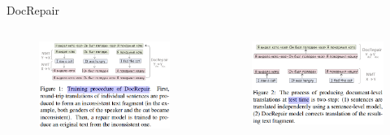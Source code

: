 \begin{frame}{DocRepair}
	\begin{columns}[c] %
		\begin{column}{.50\textwidth}
			\begin{figure}
				\centering
				\includegraphics[width=\linewidth]{Images/docrepair_train}
				\label{fig:docrepairtrain}
			\end{figure}
		\end{column}%
		\hfill%
		\begin{column}{.50\textwidth}
			\begin{figure}
				\centering
				\includegraphics[width=\textwidth]{Images/docrepair_test}
				\label{fig:docrepairtest}
			\end{figure}
		\end{column}%
	\end{columns} 
\end{frame}

